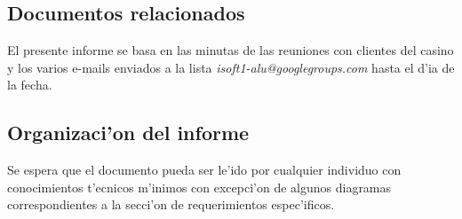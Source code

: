 \subsection{ Documentos relacionados}
El presente informe se basa en las minutas de las reuniones con clientes del casino y los varios e-mails enviados a la lista \textit{isoft1-alu@googlegroups.com} hasta el d'ia de la fecha.


\subsection{ Organizaci'on del informe	}
Se espera que el documento pueda ser le'ido por cualquier individuo con conocimientos t'ecnicos m'inimos con excepci'on de algunos diagramas correspondientes a la secci'on de requerimientos espec'ificos. 



